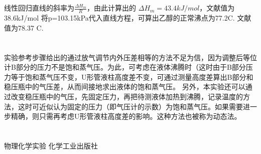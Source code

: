 \documentclass[10.5pt]{article}
\begin{document}
\subsection{\textbf{}}

线性回归直线的斜率为$\frac{\Delta H_m}{R}$，由此计算出的
$\Delta H_m =43.4kJ/mol$，文献值为38.6kJ/mol
将p=103.15kPa代入直线方程，可算出乙醇的正常沸点为77.2\degree C.
文献值为78.37 \degree C.
\section{\textbf{}}
实验参考步骤给出的通过放气调节内外压差相等的方法不足为信，因为调整后等位计B部分的压力不是饱和蒸气压。为此，可考虑在液体沸腾时（这时由于B部分压力等于饱和蒸气压不变，U形管液柱高度差不变，可通过测量高度差算出B部分和稳压瓶中的气压差，从而间接地求出液体的饱和蒸气压。
另外，本实验还可以通过改变稳压瓶中的气压，先固定压力，再把待测液体加热到沸腾，记录温度的方法，这时可近似认为固定的压力（即气压计的示数）为饱和蒸气压。如果需要进一步精确，则只需再考虑U形管液柱高度差的影响。这种方法也被称为动态法。
\section{\textbf{}}
\begin{thebibliography}{}
物理化学实验 \quad 化学工业出版社
\end{thebibliography}
\end{document}
